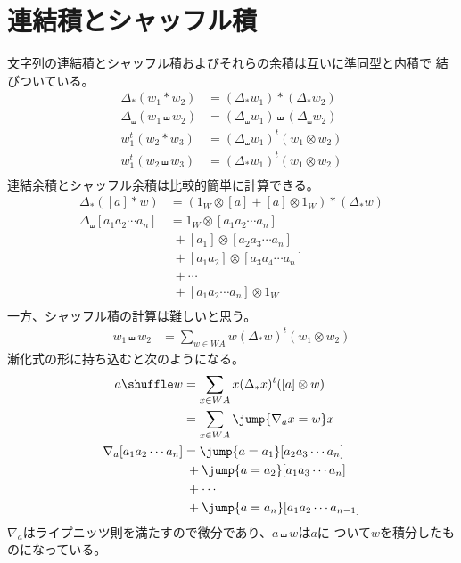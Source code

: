 \section{連結積とシャッフル積}\label{s1:連結積とシャッフル積} %
	文字列の連結積とシャッフル積およびそれらの余積は互いに準同型と内積で
	結びついている。
	\begin{equation*}\begin{split} %
		\Delta_*(w_1*w_2) &= (\Delta_*w_1) * (\Delta_*w_2) \\
		\Delta_\shuffle(w_1\shuffle w_2) 
			&= (\Delta_\shuffle w_1) \shuffle (\Delta_\shuffle w_2) \\
		w_1^t(w_2 * w_3) &= (\Delta_\shuffle w_1)^t(w_1\otimes w_2) \\
		w_1^t(w_2 \shuffle w_3) &= (\Delta_* w_1)^t(w_1\otimes w_2) \\
	\end{split}\end{equation*} %
	連結余積とシャッフル余積は比較的簡単に計算できる。
	\begin{equation*}\begin{split} %
		\Delta_*([a]*w) &= (1_W\otimes[a]+[a]\otimes1_W)*(\Delta_*w) \\
		\Delta_\shuffle[a_1a_2\cdots a_n] &= 1_W\otimes[a_1a_2\cdots a_n] \\
		&\; + [a_1]\otimes[a_2a_3\cdots a_n] \\
		&\; + [a_1a_2]\otimes[a_3a_4\cdots a_n] \\
		&\; + \cdots \\
		&\; + [a_1a_2\cdots a_n]\otimes1_W \\
	\end{split}\end{equation*} %
	一方、シャッフル積の計算は難しいと思う。
	\begin{equation*}\begin{split} %
		w_1\shuffle w_2 &= \sum_{w\in WA}w(\Delta_*w)^t(w_1\otimes w_2)
	\end{split}\end{equation*} %
	漸化式の形に持ち込むと次のようになる。
	\begin{equation*}\begin{split} %
		a\shuffle w &= \sum_{x\in WA}x(\Delta_*x)^t([a]\otimes w) \\
		&= \sum_{x\in WA}\jump{\nabla_{a}x=w}x \\
		\nabla_{a}[a_1a_2\cdots a_n]
		&= \jump{a=a_1}[a_2a_3\cdots a_n] \\
		&\;+ \jump{a=a_2}[a_1a_3\cdots a_n] \\
		&\;+ \cdots \\
		&\;+ \jump{a=a_n}[a_1a_2\cdots a_{n-1}] \\
	\end{split}\end{equation*} %
	$\nabla_a$はライプニッツ則を満たすので微分であり、$a\shuffle w$は$a$に
	ついて$w$を積分したものになっている。

